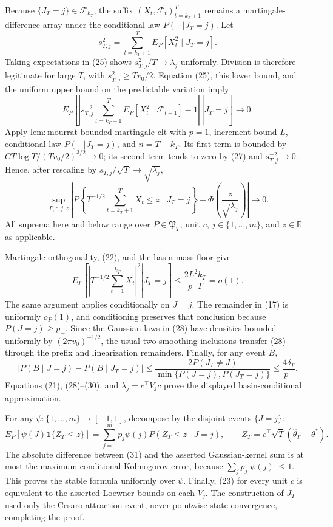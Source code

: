 Because \(\{J_T=j\}\in\mathcal F_{k_T}\), the suffix \((X_t,\mathcal F_t)_{t=k_T+1}^T\) remains a martingale-difference array under the conditional law \(P(\,\cdot\mid J_T=j)\). Let
\[
 s_{T,j}^2=\sum_{t=k_T+1}^TE_P[X_t^2\mid J_T=j]. \tag{26}
\]
Taking expectations in (25) shows \(s_{T,j}^2/T\to\lambda_j\) uniformly. Division is therefore legitimate for large \(T\), with \(s_{T,j}^2\ge Tv_0/2\). Equation (25), this lower bound, and the uniform upper bound on the predictable variation imply
\[
 E_P\!\left[\left.\left|s_{T,j}^{-2}\sum_{t=k_T+1}^T
 E_P[X_t^2\mid\mathcal F_{t-1}]-1\right|\ \right|J_T=j\right]\longrightarrow0. \tag{27}
\]
Apply \(\mathrm{lem:mourrat\text{-}bounded\text{-}martingale\text{-}clt}\) with \(p=1\), increment bound \(L\), conditional law \(P(\,\cdot\mid J_T=j)\), and \(n=T-k_T\). Its first term is bounded by \(C T\log T/(Tv_0/2)^{3/2}\to0\); its second term tends to zero by (27) and \(s_{T,j}^{-2}\to0\). Hence, after rescaling by \(s_{T,j}/\sqrt T\to\sqrt{\lambda_j}\),
\[
 \sup_{P,c,j,z}\left|P\!\left\{T^{-1/2}\sum_{t=k_T+1}^TX_t\le z\mid J_T=j\right\}
 -\Phi\!\left(\frac z{\sqrt{\lambda_j}}\right)\right|\longrightarrow0. \tag{28}
\]
All suprema here and below range over \(P\in\mathfrak P_T\), unit \(c\), \(j\in\{1,\ldots,m\}\), and \(z\in\mathbb R\) as applicable.

Martingale orthogonality, (22), and the basin-mass floor give
\[
 E_P\!\left[\left.\left|T^{-1/2}\sum_{t=1}^{k_T}X_t\right|^2\right|J_T=j\right]
 \le \frac{2L^2k_T}{p_-T}=o(1). \tag{29}
\]
The same argument applies conditionally on \(J=j\). The remainder in (17) is uniformly \(o_P(1)\), and conditioning preserves that conclusion because \(P(J=j)\ge p_-\). Since the Gaussian laws in (28) have densities bounded uniformly by \((2\pi v_0)^{-1/2}\), the usual two smoothing inclusions transfer (28) through the prefix and linearization remainders. Finally, for any event \(B\),
\[
 \left|P(B\mid J=j)-P(B\mid J_T=j)\right|
 \le \frac{2P(J_T\ne J)}{\min\{P(J=j),P(J_T=j)\}}
 \le\frac{4\delta_T}{p_-}. \tag{30}
\]
Equations (21), (28)--(30), and \(\lambda_j=c^\top V_jc\) prove the displayed basin-conditional approximation.

For any \(\psi:\{1,\ldots,m\}\to[-1,1]\), decompose by the disjoint events \(\{J=j\}\):
\[
 E_P[\psi(J)\mathbf1\{Z_T\le z\}]
 =\sum_{j=1}^mp_j\psi(j)P(Z_T\le z\mid J=j),
 \qquad Z_T=c^\top\sqrt T(\widehat\theta_T-\theta^*). \tag{31}
\]
The absolute difference between (31) and the asserted Gaussian-kernel sum is at most the maximum conditional Kolmogorov error, because \(\sum_jp_j|\psi(j)|\le1\). This proves the stable formula uniformly over \(\psi\). Finally, (23) for every unit \(c\) is equivalent to the asserted Loewner bounds on each \(V_j\). The construction of \(J_T\) used only the Cesaro attraction event, never pointwise state convergence, completing the proof.